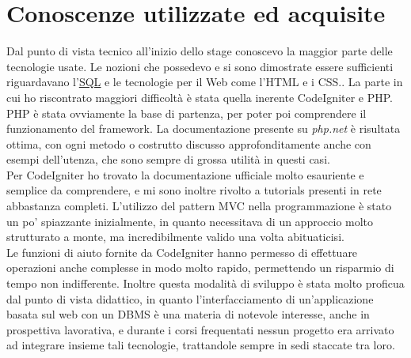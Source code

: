 \section{Conoscenze utilizzate ed acquisite}
Dal punto di vista tecnico all'inizio dello stage conoscevo la maggior parte delle tecnologie usate. Le nozioni che possedevo e si sono dimostrate essere sufficienti riguardavano l'\hyperlink{sql}{\underline{SQL}} e  le tecnologie per il Web come l'HTML e i CSS.. La parte in cui ho riscontrato maggiori difficolt\`a \`e stata quella inerente CodeIgniter e PHP. 
PHP \`e stata ovviamente la base di partenza, per poter poi comprendere il funzionamento del framework. La documentazione presente su \textit{php.net} \cite{quattro} \`e risultata ottima, con ogni metodo o costrutto discusso approfonditamente anche con esempi dell'utenza, che sono sempre di grossa utilit\`a in questi casi. \\
Per CodeIgniter ho trovato la documentazione ufficiale molto esauriente e semplice da comprendere, e mi sono inoltre rivolto a tutorials presenti in rete abbastanza completi. L'utilizzo del pattern MVC nella programmazione \`e stato un po' spiazzante inizialmente, in quanto necessitava di un approccio molto strutturato a monte, ma incredibilmente valido una volta abituaticisi. \\
Le funzioni di aiuto fornite da CodeIgniter hanno permesso di effettuare operazioni anche complesse in modo molto rapido, permettendo un risparmio di tempo non indifferente. Inoltre questa modalit\`a di sviluppo \`e stata molto proficua dal punto di vista didattico, in quanto l'interfacciamento di un'applicazione basata sul web con un DBMS \`e una materia di notevole interesse, anche in prospettiva lavorativa, e durante i corsi frequentati nessun progetto era arrivato ad integrare insieme tali tecnologie, trattandole sempre in sedi staccate tra loro. 

